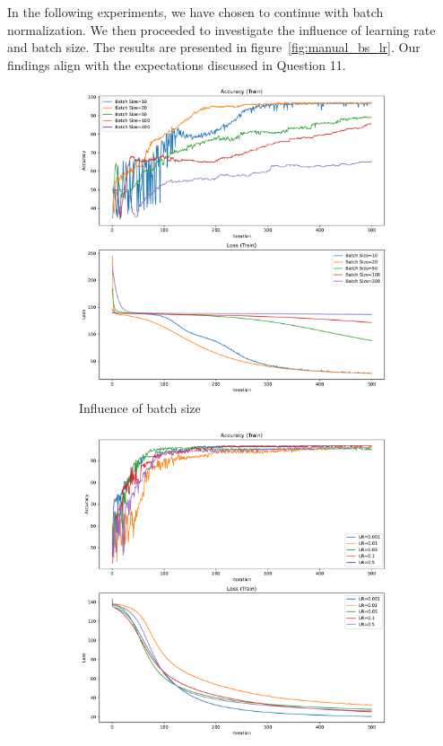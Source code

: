 In the following experiments, we have chosen to continue with batch normalization. We then proceeded to investigate the influence of learning rate and batch size. The results are presented in figure~\ref{fig:manual_bs_lr}. Our findings align with the expectations discussed in Question 11.

\begin{figure}[H]
    \centering
    \begin{subfigure}{0.45\textwidth}
        \centering
        \includegraphics[width=\textwidth]{figs/NN/manual_batchsize.pdf}
        \caption{Influence of batch size}
        \label{subfig:manual_batchsize}
    \end{subfigure}
    \begin{subfigure}{0.45\textwidth}
        \centering
        \includegraphics[width=\textwidth]{figs/NN/manual_lr.pdf}

\end{subfigure}
\end{figure}
